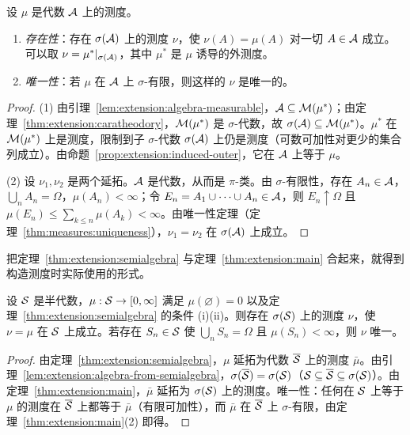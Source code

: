 \begin{theorem}\label{thm:extension:main}
设 $\mu$ 是代数 $\mathcal{A}$ 上的测度。
\begin{enumerate}
\item \emph{存在性}：存在 $\sigma(\mathcal{A})$ 上的测度 $\nu$，使 $\nu(A)=\mu(A)$ 对一切 $A\in\mathcal{A}$ 成立。可以取 $\nu=\mu^*|_{\sigma(\mathcal{A})}$，其中 $\mu^*$ 是 $\mu$ 诱导的外测度。
\item \emph{唯一性}：若 $\mu$ 在 $\mathcal{A}$ 上 $\sigma$-有限，则这样的 $\nu$ 是唯一的。
\end{enumerate}
\end{theorem}
\begin{proof}
(1) 由引理~\ref{lem:extension:algebra-measurable}，$\mathcal{A}\subseteq\mathcal{M}(\mu^*)$；由定理~\ref{thm:extension:caratheodory}，$\mathcal{M}(\mu^*)$ 是 $\sigma$-代数，故 $\sigma(\mathcal{A})\subseteq\mathcal{M}(\mu^*)$。$\mu^*$ 在 $\mathcal{M}(\mu^*)$ 上是测度，限制到子 $\sigma$-代数 $\sigma(\mathcal{A})$ 上仍是测度（可数可加性对更少的集合列成立）。由命题~\ref{prop:extension:induced-outer}，它在 $\mathcal{A}$ 上等于 $\mu$。

(2) 设 $\nu_1,\nu_2$ 是两个延拓。$\mathcal{A}$ 是代数，从而是 $\pi$-类。由 $\sigma$-有限性，存在 $A_n\in\mathcal{A}$，$\bigcup_nA_n=\Omega$，$\mu(A_n)<\infty$；令 $E_n=A_1\cup\cdots\cup A_n\in\mathcal{A}$，则 $E_n\uparrow\Omega$ 且 $\mu(E_n)\leqslant\sum_{k\leqslant n}\mu(A_k)<\infty$。由唯一性定理（定理~\ref{thm:measures:uniqueness}），$\nu_1=\nu_2$ 在 $\sigma(\mathcal{A})$ 上成立。
\end{proof}

把定理~\ref{thm:extension:semialgebra} 与定理~\ref{thm:extension:main} 合起来，就得到构造测度时实际使用的形式。

\begin{corollary}[从半代数延拓]\label{cor:extension:semialgebra}
设 $\mathcal{S}$ 是半代数，$\mu:\mathcal{S}\to[0,\infty]$ 满足 $\mu(\varnothing)=0$ 以及定理~\ref{thm:extension:semialgebra} 的条件 (i)(ii)。则存在 $\sigma(\mathcal{S})$ 上的测度 $\nu$，使 $\nu=\mu$ 在 $\mathcal{S}$ 上成立。若存在 $S_n\in\mathcal{S}$ 使 $\bigcup_nS_n=\Omega$ 且 $\mu(S_n)<\infty$，则 $\nu$ 唯一。
\end{corollary}
\begin{proof}
由定理~\ref{thm:extension:semialgebra}，$\mu$ 延拓为代数 $\overline{\mathcal{S}}$ 上的测度 $\bar\mu$。由引理~\ref{lem:extension:algebra-from-semialgebra}，$\sigma(\overline{\mathcal{S}})=\sigma(\mathcal{S})$（$\mathcal{S}\subseteq\overline{\mathcal{S}}\subseteq\sigma(\mathcal{S})$）。由定理~\ref{thm:extension:main}，$\bar\mu$ 延拓为 $\sigma(\mathcal{S})$ 上的测度。唯一性：任何在 $\mathcal{S}$ 上等于 $\mu$ 的测度在 $\overline{\mathcal{S}}$ 上都等于 $\bar\mu$（有限可加性），而 $\bar\mu$ 在 $\overline{\mathcal{S}}$ 上 $\sigma$-有限，由定理~\ref{thm:extension:main}(2) 即得。
\end{proof}

